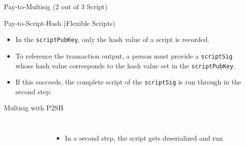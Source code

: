 \documentclass[]{beamer}
\begin{document}
\begin{frame}{Pay-to-Multisig (2 out of 3 Script)}
\centering

\end{frame}


\begin{frame}{Pay-to-Script-Hash (Flexible Scripts)}
  \vspace{1em}
\begin{itemize}
  \item<1-> In the \texttt{scriptPubKey}, only the hash value of a script is recorded.
  \item<2-> To reference the transaction output, a person must provide a \texttt{scriptSig} whose hash value corresponds to the hash value set in the \texttt{scriptPubKey}.
  \item<3-> If this succeeds, the complete script of the \texttt{scriptSig} is run through in the second step.
\end{itemize}
\end{frame}


\begin{frame}{Multisig with P2SH}
\begin{columns}
\centering
{}
\begin{figure}
	
\end{figure}
\begin{itemize}
\item<13>{In a second step, the script gets deserialized and run}
\end{itemize}
\end{columns}
\end{frame}
\end{document}
